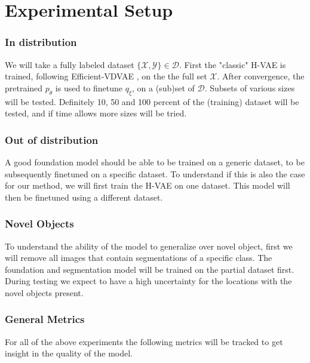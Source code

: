 \chapter{Experimental Setup}\label{chapter:second_real_chapter}

\subsection*{In distribution}
We will take a fully labeled dataset $\{\mathcal{X}, \mathcal{Y} \} \in \mathcal{D}$. First the "classic" H-VAE is trained, following Efficient-VDVAE \cite{hazami2022efficientvdvae}, on the the full set $\mathcal{X}$. After convergence, the pretrained $p_\theta$ is used to finetune $q_\xi$, on a (sub)set of $\mathcal{D}$.
Subsets of various sizes will be tested. Definitely  10, 50 and 100 percent of the (training) dataset will be tested, and if time allows more sizes will be tried.

\subsection*{Out of distribution}
A good foundation model should be able to be trained on a generic dataset, to be subsequently finetuned on a specific dataset. To understand if this is also the case for our method, we will first train the H-VAE on one dataset. This model will then be finetuned using a different dataset.

\subsection*{Novel Objects}
To understand the ability of the model to generalize over novel object, first we will remove all images that contain segmentations of a specific class. The foundation and segmentation model will be trained on the partial dataset first. During testing we expect to have a high uncertainty for the locations with the novel objects present.

\subsection*{General Metrics}
For all of the above experiments the following metrics will be tracked to get insight in the quality of the model.

